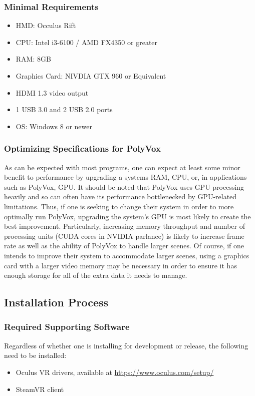 \documentclass[onecolumn, draftclsnofoot,10pt, compsoc]{IEEEtran}
\begin{document}
\subsubsection{Minimal Requirements}
\begin{itemize}
\item HMD: Occulus Rift
\item CPU: Intel i3-6100 / AMD FX4350 or greater
\item RAM: 8GB
\item Graphics Card: NIVDIA GTX 960 or Equivalent
\item HDMI 1.3 video output
\item 1 USB 3.0 and 2 USB 2.0 ports
\item OS: Windows 8 or newer
\end{itemize}
\subsubsection{Optimizing Specifications for PolyVox}
As can be expected with most programs, one can expect at least some minor benefit to performance by upgrading a systems RAM, CPU, or, in applications such as PolyVox, GPU.
It should be noted that PolyVox uses GPU processing heavily and so can often have its performance bottlenecked by GPU-related limitations.
Thus, if one is seeking to change their system in order to more optimally run PolyVox, upgrading the system’s GPU is most likely to create the best improvement.
Particularly, increasing memory throughput and number of processing units (CUDA cores in NVIDIA parlance) is likely to increase frame rate as well as the ability of PolyVox to handle larger scenes.
Of course, if one intends to improve their system to accommodate larger scenes, using a graphics card with a larger video memory may be necessary in order to ensure it has enough storage for all of the extra data it needs to manage.

\subsection{Installation Process}
\subsubsection{Required Supporting Software}
Regardless of whether one is installing for development or release, the following need to be installed:
\begin{itemize}
\item Oculus VR drivers, available at \url{https://www.oculus.com/setup/}
\item SteamVR client
\end{itemize}
\end{document}
